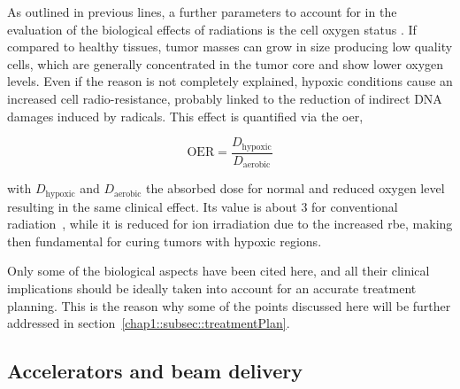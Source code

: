 As outlined in previous lines, a further parameters to account for in the evaluation of the biological effects of radiations is the cell oxygen status . If compared to healthy tissues, tumor masses can grow in size producing low quality cells, which are generally concentrated in the tumor core and show lower oxygen levels. Even if the reason is not completely explained, hypoxic conditions cause an increased cell radio-resistance, probably linked to the reduction of indirect DNA damages induced by radicals. This effect is quantified via the \gls{oer}, 

\begin{equation}
\mathrm{OER} = \frac{D_{\mathrm{hypoxic}}}{D_{\mathrm{aerobic}}}
\label{chap1::eq::oer}
\end{equation}

with $D_{\mathrm{hypoxic}}$ and $D_{\mathrm{aerobic}}$ the absorbed dose for normal and reduced oxygen level resulting in the same clinical effect. Its value is about 3 for conventional radiation~\parencite{Schardt2010}, while it is reduced for ion irradiation due to the increased \gls{rbe}, making then fundamental for curing tumors with hypoxic regions.

Only some of the biological aspects have been cited here, and all their clinical implications should be ideally taken into account for an accurate treatment planning. This is the reason why some of the points discussed here will be further addressed in section~\ref{chap1::subsec::treatmentPlan}. 

\subsection{Accelerators and beam delivery}\label{chap1::subsec::beamDelivery}

